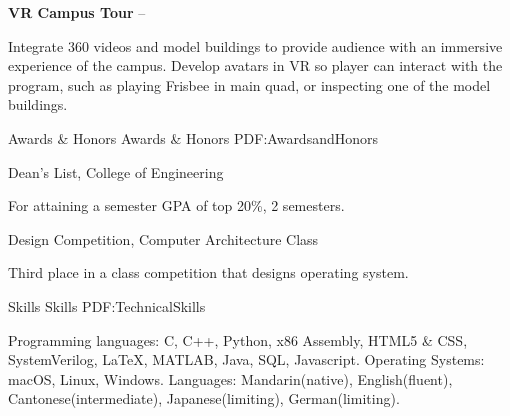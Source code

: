 \documentclass[letterpaper,MMMyyyy,nonstopmode]{simpleresumecv}
\begin{document}
\begin{Body}
\Entry
\textbf{VR Campus Tour}
\hfill
{} --
\Gap

\begin{Detail}
\BulletItem
Integrate 360 videos and model buildings to provide audience with an immersive experience of the campus.
\BulletItem
Develop avatars in VR so player can interact with the program, such as playing Frisbee in main quad, or inspecting one of the model buildings.
\end{Detail}



\Section
{Awards \& Honors}
{Awards \& Honors}
{PDF:AwardsandHonors}

\BulletItem
Dean's List,
College of Engineering
\hfill
\begin{Detail}
\Item
For attaining a semester GPA of top 20\%, 2 semesters.
\end{Detail}

\BulletItem
Design Competition,
Computer Architecture Class
\hfill
\begin{Detail}
\Item
Third place in a class competition that designs operating system.
\end{Detail}



\Section
{Skills}
{Skills}
{PDF:TechnicalSkills}

\Entry
\BulletItem
Programming languages: C, C++, Python, x86 Assembly, HTML5 \& CSS, SystemVerilog, {\LaTeX}, MATLAB,  Java, SQL, Javascript.
\BulletItem
Operating Systems: macOS, Linux, Windows.
\BulletItem
Languages: Mandarin(native), English(fluent), Cantonese(intermediate), Japanese(limiting), German(limiting).
\end{Body}
\end{document}
